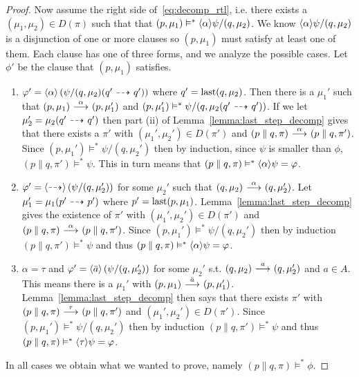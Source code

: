 \begin{proof}
    \rtl Now assume the right side of~\eqref{eq:decomp_rtl}, i.e. there exists a $(\mu_1,\mu_2)
    \in D(\pi)$ such that that $(p,\mu_1) \vDash^* \mbox{\ensuremath{\langle \alpha \rangle}}\psi / (q,\mu_2)$.
    We know $\mbox{\ensuremath{\langle \alpha \rangle}}\psi / (q,\mu_2)$ is a disjunction of one or more clauses
    so $(p,\mu_1)$ must satisfy at least one of them. Each clause has one of three
    forms, and we analyze the possible cases.
    Let $\phi'$ be the clause that $(p,\mu_1)$ satisfies.
    \begin{enumerate}
        \item $\varphi' = \mbox{\ensuremath{\langle \alpha \rangle}} \left(\psi / (q,\mu_2)(q' \ {\stackrel{_{}}{\dashrightarrow}}\  q') \right)$
            where $q' = \operatorname{last}(q,\mu_2)$.
            Then there is a $\mu_1'$ such that $(p,\mu_1) \ {\stackrel{{\alpha}}{\longrightarrow}}\  (p,\mu_1')$
            and $(p,\mu_1') \vDash^* \psi/(q,\mu_2(q'\ {\stackrel{_{}}{\dashrightarrow}}\ q'))$. If
            we let $\mu_2' = \mu_2(q' \ {\stackrel{_{}}{\dashrightarrow}}\  q')$ then 
            part (ii) of
            Lemma~\ref{lemma:last_step_decomp}
            gives that there exists a $\pi'$ with $(\mu_1',\mu_2')\in D(\pi')$ and
            $(p\parallel q, \pi) \ {\stackrel{{\alpha}}{\longrightarrow}}\  (p\parallel q, \pi')$.
            Since $(p,\mu_1')
            \vDash^* \psi / (q,\mu_2')$ then by induction, since $\psi$ is smaller than
            $\phi$, $(p\parallel q, \pi') \vDash^* \psi$. This in turn means that
            $(p\parallel q, \pi) \vDash^* \mbox{\ensuremath{\langle \alpha \rangle}}\psi = \varphi$.
        \item $\varphi' = \mbox{\ensuremath{\langle\stackrel{_{}}{\dashrightarrow}\rangle}} \left(\psi / (q,\mu_2')\right)$ for some $\mu_2'$
            such that $(q,\mu_2) \ {\stackrel{{\alpha}}{\longrightarrow}}\  (q,\mu_2')$. Let $\mu_1' = \mu_1(p'
            \ {\stackrel{_{}}{\dashrightarrow}}\  p')$ where $p' = \operatorname{last}(p,\mu_1)$. Lemma~\ref{lemma:last_step_decomp}
            gives the existence of $\pi'$ with $(\mu_1',\mu_2')\in D(\pi')$ and $(p\parallel
            q,\pi) \ {\stackrel{{\alpha}}{\longrightarrow}}\  (p\parallel q, \pi')$. Since $(p,\mu_1')\vDash^* \psi
            / (q,\mu_2')$ then by induction $(p\parallel q,\pi') \vDash^* \psi$ and thus
            $(p\parallel q, \pi) \vDash^* \mbox{\ensuremath{\langle \alpha \rangle}}\psi = \varphi$.
        \item $\alpha = \tau$ and $\varphi' = \mbox{\ensuremath{\langle \bar{a} \rangle}} \left( \psi / (q,\mu_2') \right)$
            for some $\mu_2'$ s.t. $(q,\mu_2)\ {\stackrel{{a}}{\longrightarrow}}\ (q,\mu_2')$ and $a\in A$.
            This means there is a
            $\mu_1'$ with $(p,\mu_1) \ {\stackrel{{\bar{a}}}{\longrightarrow}}\  (p,\mu_1')$.
            Lemma~\ref{lemma:last_step_decomp} then says that there exists $\pi'$ with $(p
            \parallel q, \pi) \ {\stackrel{{\tau}}{\longrightarrow}}\  (p\parallel q, \pi')$ and $(\mu_1',\mu_2')
            \in D(\pi')$. Since $(p,\mu_1')\vDash^* \psi / (q,\mu_2')$ then by induction
            $(p\parallel q,\pi')\vDash^* \psi$ and thus $(p\parallel q, \pi) \vDash^*
            \mbox{\ensuremath{\langle \tau \rangle}}\psi = \varphi$.
    \end{enumerate}
    In all cases we obtain what we wanted to prove, namely $(p\parallel q, \pi) \vDash^* \phi$.



\end{proof}
